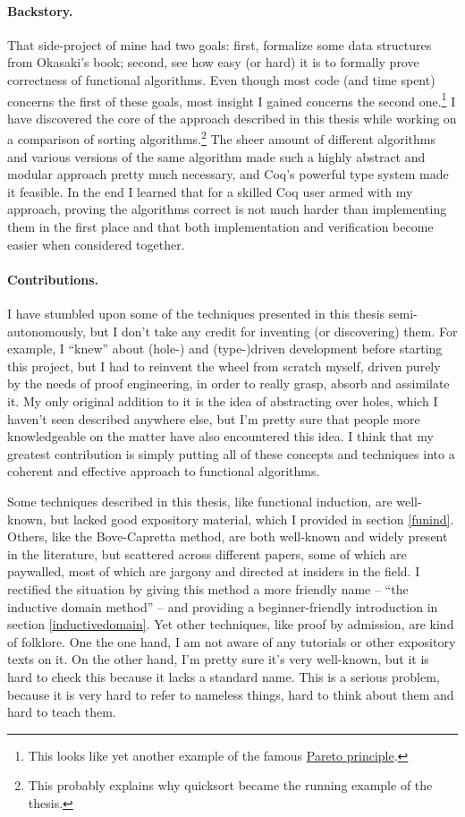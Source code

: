 \documentclass[declaration,mgr,english,shortabstract]{iithesis}
\begin{document}
\paragraph{Backstory.}{That side-project of mine had two goals: first, formalize some data structures from Okasaki's book; second, see how easy (or hard) it is to formally prove correctness of functional algorithms. Even though most code (and time spent) concerns the first of these goals, most insight I gained concerns the second one.\footnote{This looks like yet another example of the famous \href{https://en.wikipedia.org/wiki/Pareto_principle}{Pareto principle}.} I have discovered the core of the approach described in this thesis while working on a comparison of sorting algorithms.\footnote{This probably explains why quicksort became the running example of the thesis.} The sheer amount of different algorithms and various versions of the same algorithm made such a highly abstract and modular approach pretty much necessary, and Coq's powerful type system made it feasible. In the end I learned that for a skilled Coq user armed with my approach, proving the algorithms correct is not much harder than implementing them in the first place and that both implementation and verification become easier when considered together.}

\paragraph{Contributions.}{I have stumbled upon some of the techniques presented in this thesis semi-autonomously, but I don't take any credit for inventing (or discovering) them. For example, I ``knew'' about (hole-) and (type-)driven development before starting this project, but I had to reinvent the wheel from scratch myself, driven purely by the needs of proof engineering, in order to really grasp, absorb and assimilate it. My only original addition to it is the idea of abstracting over holes, which I haven't seen described anywhere else, but I'm pretty sure that people more knowledgeable on the matter have also encountered this idea. I think that my greatest contribution is simply putting all of these concepts and techniques into a coherent and effective approach to functional algorithms.

Some techniques described in this thesis, like functional induction, are well-known, but lacked good expository material, which I provided in section \ref{funind}. Others, like the Bove-Capretta method, are both well-known and widely present in the literature, but scattered across different papers, some of which are paywalled, most of which are jargony and directed at insiders in the field. I rectified the situation by giving this method a more friendly name -- ``the inductive domain method'' -- and providing a beginner-friendly introduction in section \ref{inductivedomain}. Yet other techniques, like proof by admission, are kind of folklore. One the one hand, I am not aware of any tutorials or other expository texts on it. On the other hand, I'm pretty sure it's very well-known, but it is hard to check this because it lacks a standard name. This is a serious problem, because it is very hard to refer to nameless things, hard to think about them and hard to teach them.}
\end{document}
